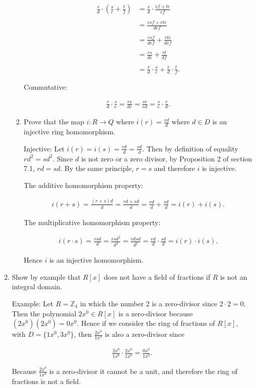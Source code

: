 \documentclass[11pt]{article}
\begin{document}
\begin{enumerate}
\begin{enumerate}
    \begin{align*}
      \frac{r}{d}\cdot\left(\frac s e +\frac t f\right) &= \frac r d \cdot \frac{sf+te}{ef} \\\\
      &= \frac{rsf+rte}{def} \\\\
      &= \frac{rsf}{def}+\frac{rte}{def} \\\\
      &= \frac{rs}{de}+\frac{rt}{df} \\\\
      &= \frac r d \cdot \frac s e + \frac r d \cdot \frac t f.
    \end{align*}

    Commutative:

    \begin{align*}
      \frac r d \cdot \frac s e = \frac{rs}{de} = \frac{sr}{ed} = \frac s e \cdot \frac r d.
    \end{align*}

    \item Prove that the map $i:R \to Q$ where $i(r)=\frac{rd}{d}$ where $d\in D$ is an injective ring homomorphism.

    Injective: Let $i(r)=i(s) = \frac{rd}{d} = \frac{sd}{d}$.  Then by definition of equality $rd^2 = sd^2$.  Since $d$ is not zero or a zero divisor, by Proposition 2 of section 7.1, $rd=sd$.  By the same principle, $r=s$ and therefore $i$ is injective.

    The additive homomorphism property:

    \begin{align*}
      i(r+s)=\frac{(r+s)d}{d}=\frac{rd+sd}{d}=\frac{rd}{d}+\frac{sd}{d}=i(r)+i(s).
    \end{align*}

    The multiplicative homomorphism property:

    \begin{align*}
      i(r\cdot s)=\frac{rsd}{d} = \frac{rsd^2}{d^2}=\frac{rdsd}{d^2}=\frac{rd}{d}\cdot \frac{sd}{d}=i(r)\cdot i(s).
    \end{align*}

    Hence $i$ is an injective homomorphism.
  \end{enumerate}

  \item Show by example that $R[x]$ does not have a field of fractions if $R$ is not an integral domain.

  Example: Let $R=\mathbb Z_4$ in which the number 2 is a zero-divisor since $2\cdot 2=0$.  Then the polynomial $2x^0\in R[x]$ is a zero-divisor because $(2x^0)(2x^0)=0x^0$.  Hence if we consider the ring of fractions of $R[x]$, with $D=\{1x^0,3x^0\}$, then $\frac{2x^0}{1x^0}$ is also a zero-divisor since

  \begin{align*}
    \frac{2x^0}{1x^0}\cdot \frac{2x^0}{1x^0}= \frac{0x^0}{1x^0}.
  \end{align*}

  Because $\frac{2x^0}{1x^0}$ is a zero-divisor it cannot be a unit, and therefore the ring of fractions is not a field.

\end{enumerate}
\end{document}
